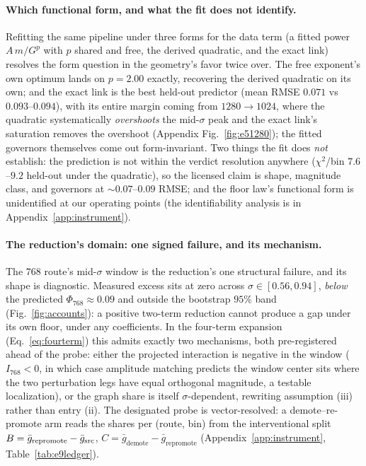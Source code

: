 \paragraph{Which functional form, and what the fit does not identify.}
Refitting the same pipeline under three forms for the data term (a
fitted power $A\,m/G^p$ with $p$ shared and free, the derived
quadratic, and the exact link) resolves the form question in the
geometry's favor twice over. The free exponent's own optimum lands on
$p = 2.00$ exactly, recovering the derived quadratic on its own; and
the exact link is the best held-out predictor (mean RMSE $0.071$ vs
$0.093$--$0.094$), with its entire margin coming from $1280{\to}1024$,
where the quadratic systematically \emph{overshoots} the mid-$\sigma$
peak and the exact link's saturation removes the overshoot (Appendix
Fig.~\ref{fig:e51280}); the fitted governors themselves come out
form-invariant. Two things
the fit does \emph{not} establish: the prediction is not within
the verdict resolution anywhere ($\chi^2$/bin $7.6$--$9.2$ held-out
under the quadratic), so the licensed claim is shape, magnitude class,
and governors at ${\sim}0.07$--$0.09$ RMSE; and the floor law's
functional form is unidentified at our operating points
(the identifiability analysis is in Appendix~\ref{app:instrument}).

\paragraph{The reduction's domain: one signed failure, and its
mechanism.}
The $768$ route's mid-$\sigma$ window is the reduction's one structural
failure, and its shape is diagnostic. Measured excess sits at zero
across $\sigma \in [0.56, 0.94]$, \emph{below} the predicted
$\Phi_{768} \approx 0.09$ and outside the bootstrap $95\%$ band
(Fig.~\ref{fig:accounts}): a positive two-term reduction cannot produce a gap
under its own floor, under any coefficients. In the four-term expansion
(Eq.~\ref{eq:fourterm}) this admits exactly two mechanisms, both
pre-registered ahead of the probe: either the projected interaction
is negative in the window ($I_{768} < 0$, in which case amplitude
matching predicts the window center sits where the two perturbation
legs have equal orthogonal magnitude, a testable localization), or the
graph share is itself $\sigma$-dependent, rewriting assumption (iii)
rather than entry (ii). The designated probe is vector-resolved: a
demote--re-promote arm reads the shares per (route, bin) from the
interventional split $B = \bar g_{\mathrm{repromote}} - \bar g_{\mathrm{src}}$,
$C = \bar g_{\mathrm{demote}} - \bar g_{\mathrm{repromote}}$
(Appendix~\ref{app:instrument}, Table~\ref{tab:e9ledger}).

